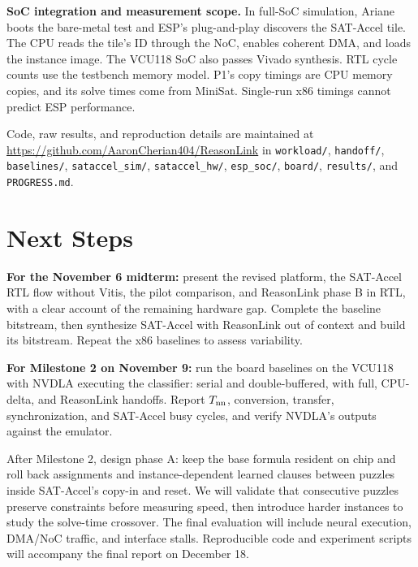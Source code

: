 \documentclass[conference,10pt,letterpaper]{IEEEtran}
\begin{document}
\textbf{SoC integration and measurement scope.} In full-SoC simulation, Ariane boots the bare-metal test and ESP's plug-and-play discovers the SAT-Accel tile. The CPU reads the tile's ID through the NoC, enables coherent DMA, and loads the instance image. The VCU118 SoC also passes Vivado synthesis. RTL cycle counts use the testbench memory model. P1's copy timings are CPU memory copies, and its solve times come from MiniSat. Single-run x86 timings cannot predict ESP performance.

Code, raw results, and reproduction details are maintained at \url{https://github.com/AaronCherian404/ReasonLink} in \texttt{workload/}, \texttt{handoff/}, \texttt{baselines/}, \texttt{sataccel\_sim/}, \texttt{sataccel\_hw/}, \texttt{esp\_soc/}, \texttt{board/}, \texttt{results/}, and \texttt{PROGRESS.md}.

\section{Next Steps}
\textbf{For the November 6 midterm:} present the revised platform, the SAT-Accel RTL flow without Vitis, the pilot comparison, and ReasonLink phase B in RTL, with a clear account of the remaining hardware gap. Complete the baseline bitstream, then synthesize SAT-Accel with ReasonLink out of context and build its bitstream. Repeat the x86 baselines to assess variability.

\textbf{For Milestone 2 on November 9:} run the board baselines on the VCU118 with NVDLA executing the classifier: serial and double-buffered, with full, CPU-delta, and ReasonLink handoffs. Report $T_{\rm nn}$, conversion, transfer, synchronization, and SAT-Accel busy cycles, and verify NVDLA's outputs against the emulator.

After Milestone 2, design phase A: keep the base formula resident on chip and roll back assignments and instance-dependent learned clauses between puzzles inside SAT-Accel's copy-in and reset. We will validate that consecutive puzzles preserve constraints before measuring speed, then introduce harder instances to study the solve-time crossover. The final evaluation will include neural execution, DMA/NoC traffic, and interface stalls. Reproducible code and experiment scripts will accompany the final report on December 18.



\end{document}
